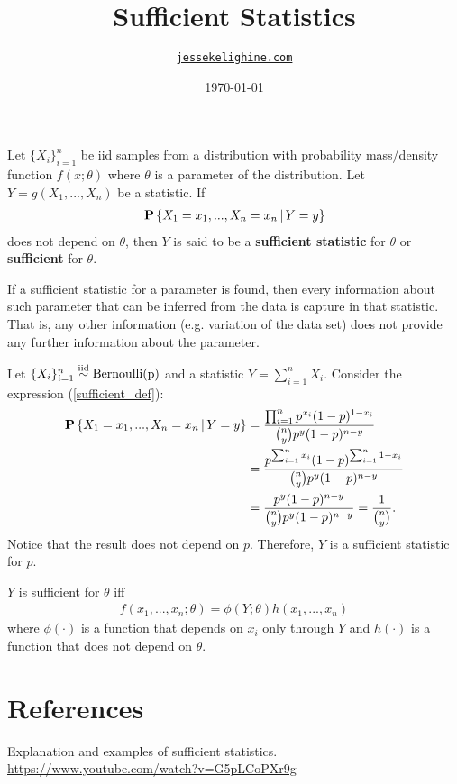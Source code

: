 \documentclass[a4paper,12pt]{article}
\title{Sufficient Statistics}
\author{\href{https://jessekelighine.com}{\texttt{jessekelighine.com}}}
\date{\today}
\begin{document}
\maketitle

\begin{definition}
	Let $\{X_i\}_{i=1}^{n}$ be iid samples from a distribution with
	probability mass/density function $f(x;\theta)$ where $\theta$ is
	a parameter of the distribution.
	Let $Y=g(X_1,...,X_n)$ be a statistic.
	If
	\begin{align}\label{sufficient_def}
		\operatorname{\text{\textrm{\upshape\textbf{P}}}}\left\{X_1=x_1,...,X_n=x_n\,|\, Y=y\right\}
	\end{align}
	does not depend on $\theta$,
	then $Y$ is said to be a \textbf{sufficient statistic} for $\theta$
	or \textbf{sufficient} for $\theta$.
\end{definition}

\begin{remark}
	If a sufficient statistic for a parameter is found,
	then every information about such parameter that can be inferred from the
	data is capture in that statistic.
	That is, any other information (e.g.\! variation of the data set)
	does not provide any further information about the parameter.
\end{remark}

\begin{example}
	Let $\{X_i\}_{i=1}^{n}\overset{\text{\scriptsize iid}}{\sim}\text{Bernoulli(p)}$ and a statistic $Y=\sum_{i=1}^{n}X_i$.
	Consider the expression (\ref{sufficient_def}):
	\begin{align*}
		\operatorname{\text{\textrm{\upshape\textbf{P}}}}\left\{X_1=x_1,...,X_n=x_n\,|\, Y=y\right\}
		&= \frac{ \prod_{i=1}^{n} p^{x_i} (1-p)^{1-x_i} }{ {n\choose y}p^{y}(1-p)^{n-y} } \\
		&= \frac{ p^{\sum_{i=1}^{n}x_i} (1-p)^{\sum_{i=1}^{n}1-x_i} }{ {n\choose y}p^{y}(1-p)^{n-y} } \\
		&= \frac{ p^{y}(1-p)^{n-y} }{ {n\choose y}p^{y}(1-p)^{n-y} }
		= \frac{1}{{n\choose y}}.
	\end{align*}
	Notice that the result does not depend on $p$.
	Therefore, $Y$ is a sufficient statistic for $p$.
\end{example}

\begin{theorem}
	$Y$ is sufficient for $\theta$ iff
	\begin{align*}
		f(x_1,...,x_n;\theta) = \phi(Y;\theta)h(x_1,...,x_n)
	\end{align*}
	where $\phi(\cdot)$ is a function that depends on $x_i$ only through $Y$
	and $h(\cdot)$ is a function that does not depend on $\theta$.
\end{theorem}

\vfill
\section*{References}
\begin{enumerate}[label = {[\arabic*]}]
	\item Explanation and examples of sufficient statistics. \url{https://www.youtube.com/watch?v=G5pLCoPXr9g}
\end{enumerate}
\end{document}

